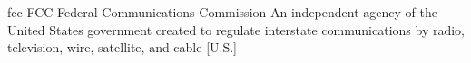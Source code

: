 \newglsXgovernment%
{fcc}%
{FCC}%
{Federal Communications Commission}%
{An independent agency of the United States government created to regulate interstate communications by radio, television, wire, satellite, and cable \cite{website:Federal_Communications_Commission}}%
[U.S.]%
